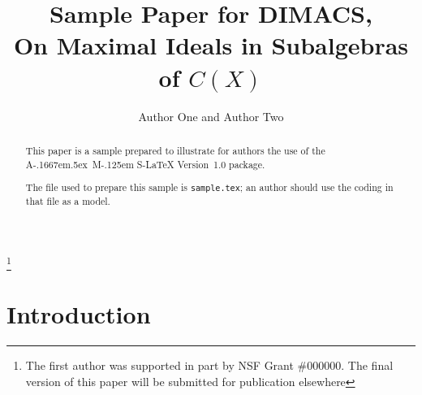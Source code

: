 %
%

\newtheorem{lemma}{Lemma}[section]
\newtheorem{definition}{Definition}[section]

\newcommand{\AmSLaTeX}{{\the\textfont2 A}\kern-.1667em\lower.5ex\hbox
 {\the\textfont2 M}\kern-.125em{\the\textfont2 S}-\LaTeX}



\title[MAXIMAL IDEALS IN SUBALGEBRAS OF $C(X)$]{Sample Paper for DIMACS,\\
On Maximal Ideals in Subalgebras of $C(X)$}
\author[AUTHOR ONE AND AUTHOR TWO]{Author One and Author Two}
\address{Department of Mathematics, Northeastern University, Boston,
Massachusetts 02115} %
\address{Mathematical Research Section, School of Mathematical Sciences,
Australian National University, Canberra ACT 2601, Australia} %


\thanks{The first author was supported in part by NSF
Grant \#000000.\endgraf
The final version of this paper will be submitted for
publication elsewhere}

\maketitle

\begin{abstract}
This paper is a sample prepared to illustrate for authors
the use of the \AmSLaTeX{} Version~1.0 package.

The file used to prepare this sample is \verb+sample.tex+; an author
should use the coding in that file as a model.
\end{abstract}

\section{Introduction}


